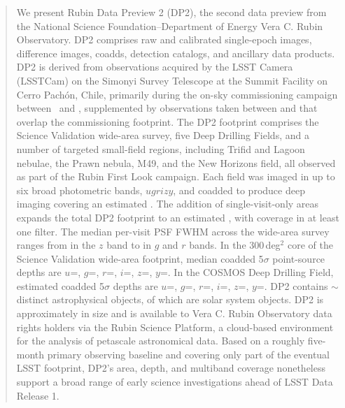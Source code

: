 \begin{abstract}
We present Rubin Data Preview 2 (DP2), the second data preview from the National Science Foundation--Department of Energy Vera C. Rubin Observatory.
DP2 comprises raw and calibrated single-epoch images, difference images, coadds, detection catalogs, and ancillary data products.
DP2 is derived from observations acquired by the LSST Camera (LSSTCam) on the Simonyi Survey Telescope at the Summit Facility on Cerro Pach\'on, Chile, primarily during the on-sky commissioning campaign between \dptwostartdate\ and \svcampaignenddate, supplemented by observations taken between \startoperations and \dptwoenddate  that overlap the commissioning footprint.
The DP2 footprint comprises the Science Validation wide-area survey, five Deep Drilling Fields, and a number of targeted small-field regions, including Trifid and Lagoon nebulae, the Prawn nebula, M49, and the New Horizons field, all observed as part of the Rubin First Look campaign.
Each field was imaged in up to six broad photometric bands, $ugrizy$, and coadded to produce deep imaging covering an estimated \coaddedarea.
The addition of single-visit-only areas expands the total DP2 footprint to an estimated \dptwoarea, with coverage in at least one filter.
The median per-visit PSF FWHM across the wide-area survey ranges from \zmedianpsffwhmwide in the $z$ band to \grmedianpsffwhmwide in $g$ and $r$ bands.
In the 300\,deg$^2$ core of the Science Validation wide-area footprint, median coadded 5$\sigma$ point-source depths are $u$=\svcoreumaglim, $g$=\svcoregmaglim, $r$=\svcorermaglim, $i$=\svcoreimaglim, $z$=\svcorezmaglim, $y$=\svcoreymaglim.
In the COSMOS Deep Drilling Field, estimated coadded 5$\sigma$ depths are $u$=\cosmosumaglim, $g$=\cosmosgmaglim, $r$=\cosmosrmaglim, $i$=\cosmosimaglim, $z$=\cosmoszmaglim, $y$=\cosmosymaglim.
DP2 contains $\sim$\nobjects distinct astrophysical objects, of which \nssobjects are solar system objects.
DP2 is approximately \edptwosize in size and is available to Vera C. Rubin Observatory data rights holders via the Rubin Science Platform, a cloud-based environment for the analysis of petascale astronomical data.
Based on a roughly five-month primary observing baseline and covering only part of the eventual LSST footprint, DP2's area, depth, and multiband coverage nonetheless support a broad range of early science investigations ahead of LSST Data Release 1.
\end{abstract}
